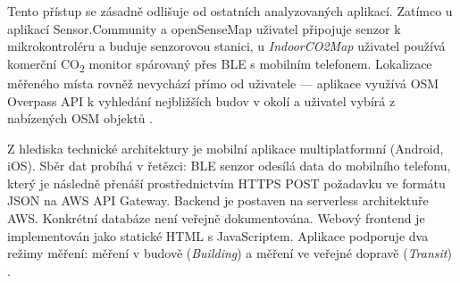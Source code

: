 Tento přístup se zásadně odlišuje od ostatních analyzovaných aplikací. Zatímco u aplikací Sensor.Community a openSenseMap uživatel připojuje senzor k mikrokontroléru a buduje senzorovou stanici, u \textit{IndoorCO2Map} uživatel používá komerční CO\textsubscript{2} monitor spárovaný přes BLE s mobilním telefonem. Lokalizace měřeného místa rovněž nevychází přímo od uživatele — aplikace využívá OSM Overpass API k vyhledání nejbližších budov v okolí a uživatel vybírá z nabízených OSM objektů \parencite{aurelwuAurelWuIndoorCO2MapApp2026, IndoorCO2MapCO2Monitoring2024}.

Z hlediska technické architektury je mobilní aplikace multiplatformní (Android, iOS). Sběr dat probíhá v řetězci: BLE senzor odesílá data do mobilního telefonu, který je následně přenáší prostřednictvím HTTPS POST požadavku ve formátu JSON na AWS API Gateway. Backend je postaven na serverless architektuře AWS. Konkrétní databáze není veřejně dokumentována. Webový frontend je implementován jako statické HTML s JavaScriptem. Aplikace podporuje dva režimy měření: měření v budově (\textit{Building}) a měření ve veřejné dopravě (\textit{Transit}) \parencite{aurelwuAurelWuIndoorCO2MapApp2026}.
